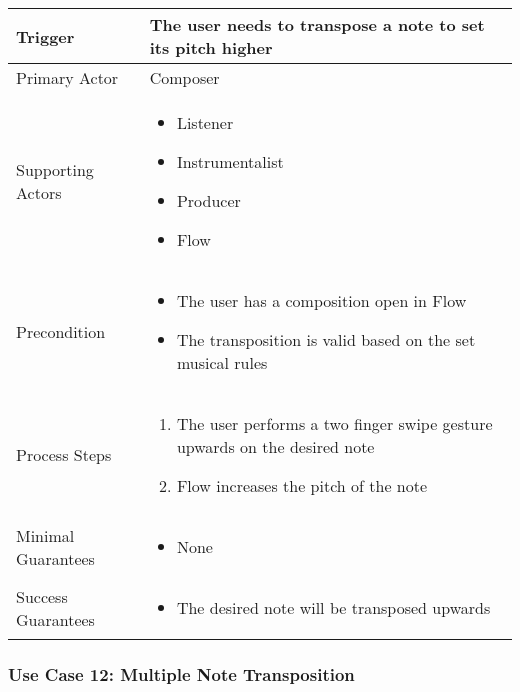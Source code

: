   \begin{tabularx}{\textwidth}{|X|X|}
  \hline
  Trigger & 
  The user needs to transpose a note to set its pitch higher \\
  \hline
  Primary Actor & 
  Composer \\
  \hline
  Supporting Actors & 
  \begin{itemize}
  \item Listener
  \item Instrumentalist
  \item Producer
  \item Flow
  \end{itemize} \\
  \hline
  Precondition & 
  \begin{itemize}
  \item The user has a composition open in Flow
  \item The transposition is valid based on the set musical rules
  \end{itemize} \\
  \hline
  Process Steps & 
  \begin{enumerate}
  \item The user performs a two finger swipe gesture upwards on the desired note
  \item Flow increases the pitch of the note
  \end{enumerate} \\
  \hline
  Minimal Guarantees & 
  \begin{itemize}
    \item None
  \end{itemize} \\
  \hline
  Success Guarantees & 
  \begin{itemize}
    \item The desired note will be transposed upwards
  \end{itemize} \\
  \hline
  \end{tabularx}

  \subsubsection{Use Case 12: Multiple Note Transposition}

